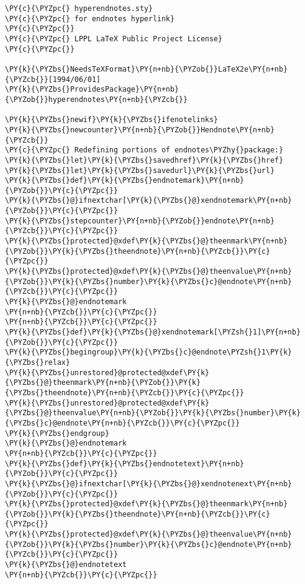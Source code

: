 \begin{Verbatim}[commandchars=\\\{\}]
\PY{c}{\PYZpc{} hyperendnotes.sty}
\PY{c}{\PYZpc{} for endnotes hyperlink}
\PY{c}{\PYZpc{}}
\PY{c}{\PYZpc{} LPPL LaTeX Public Project License}
\PY{c}{\PYZpc{}}

\PY{k}{\PYZbs{}NeedsTeXFormat}\PY{n+nb}{\PYZob{}}LaTeX2e\PY{n+nb}{\PYZcb{}}[1994/06/01]
\PY{k}{\PYZbs{}ProvidesPackage}\PY{n+nb}{\PYZob{}}hyperendnotes\PY{n+nb}{\PYZcb{}}

\PY{k}{\PYZbs{}newif}\PY{k}{\PYZbs{}ifenotelinks}
\PY{k}{\PYZbs{}newcounter}\PY{n+nb}{\PYZob{}}Hendnote\PY{n+nb}{\PYZcb{}}
\PY{c}{\PYZpc{} Redefining portions of endnotes\PYZhy{}package:}
\PY{k}{\PYZbs{}let}\PY{k}{\PYZbs{}savedhref}\PY{k}{\PYZbs{}href}
\PY{k}{\PYZbs{}let}\PY{k}{\PYZbs{}savedurl}\PY{k}{\PYZbs{}url}
\PY{k}{\PYZbs{}def}\PY{k}{\PYZbs{}endnotemark}\PY{n+nb}{\PYZob{}}\PY{c}{\PYZpc{}}
\PY{k}{\PYZbs{}@}ifnextchar[\PY{k}{\PYZbs{}@}xendnotemark\PY{n+nb}{\PYZob{}}\PY{c}{\PYZpc{}}
\PY{k}{\PYZbs{}stepcounter}\PY{n+nb}{\PYZob{}}endnote\PY{n+nb}{\PYZcb{}}\PY{c}{\PYZpc{}}
\PY{k}{\PYZbs{}protected}@xdef\PY{k}{\PYZbs{}@}theenmark\PY{n+nb}{\PYZob{}}\PY{k}{\PYZbs{}theendnote}\PY{n+nb}{\PYZcb{}}\PY{c}{\PYZpc{}}
\PY{k}{\PYZbs{}protected}@xdef\PY{k}{\PYZbs{}@}theenvalue\PY{n+nb}{\PYZob{}}\PY{k}{\PYZbs{}number}\PY{k}{\PYZbs{}c}@endnote\PY{n+nb}{\PYZcb{}}\PY{c}{\PYZpc{}}
\PY{k}{\PYZbs{}@}endnotemark
\PY{n+nb}{\PYZcb{}}\PY{c}{\PYZpc{}}
\PY{n+nb}{\PYZcb{}}\PY{c}{\PYZpc{}}
\PY{k}{\PYZbs{}def}\PY{k}{\PYZbs{}@}xendnotemark[\PYZsh{}1]\PY{n+nb}{\PYZob{}}\PY{c}{\PYZpc{}}
\PY{k}{\PYZbs{}begingroup}\PY{k}{\PYZbs{}c}@endnote\PYZsh{}1\PY{k}{\PYZbs{}relax}
\PY{k}{\PYZbs{}unrestored}@protected@xdef\PY{k}{\PYZbs{}@}theenmark\PY{n+nb}{\PYZob{}}\PY{k}{\PYZbs{}theendnote}\PY{n+nb}{\PYZcb{}}\PY{c}{\PYZpc{}}
\PY{k}{\PYZbs{}unrestored}@protected@xdef\PY{k}{\PYZbs{}@}theenvalue\PY{n+nb}{\PYZob{}}\PY{k}{\PYZbs{}number}\PY{k}{\PYZbs{}c}@endnote\PY{n+nb}{\PYZcb{}}\PY{c}{\PYZpc{}}
\PY{k}{\PYZbs{}endgroup}
\PY{k}{\PYZbs{}@}endnotemark
\PY{n+nb}{\PYZcb{}}\PY{c}{\PYZpc{}}
\PY{k}{\PYZbs{}def}\PY{k}{\PYZbs{}endnotetext}\PY{n+nb}{\PYZob{}}\PY{c}{\PYZpc{}}
\PY{k}{\PYZbs{}@}ifnextchar[\PY{k}{\PYZbs{}@}xendnotenext\PY{n+nb}{\PYZob{}}\PY{c}{\PYZpc{}}
\PY{k}{\PYZbs{}protected}@xdef\PY{k}{\PYZbs{}@}theenmark\PY{n+nb}{\PYZob{}}\PY{k}{\PYZbs{}theendnote}\PY{n+nb}{\PYZcb{}}\PY{c}{\PYZpc{}}
\PY{k}{\PYZbs{}protected}@xdef\PY{k}{\PYZbs{}@}theenvalue\PY{n+nb}{\PYZob{}}\PY{k}{\PYZbs{}number}\PY{k}{\PYZbs{}c}@endnote\PY{n+nb}{\PYZcb{}}\PY{c}{\PYZpc{}}
\PY{k}{\PYZbs{}@}endnotetext
\PY{n+nb}{\PYZcb{}}\PY{c}{\PYZpc{}}

\end{Verbatim}
